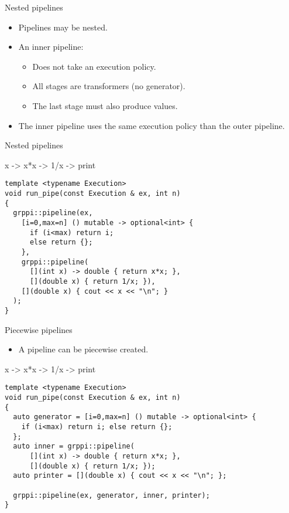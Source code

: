 \begin{frame}[t,fragile]{Nested pipelines}
\begin{itemize}
  \item Pipelines may be nested.
  \vfill
  \item An inner pipeline:
    \begin{itemize}
      \item Does not take an execution policy.
      \item All stages are transformers (no generator).
      \item The last stage must also produce values.
    \end{itemize}
  \vfill
  \item The inner pipeline uses the same execution policy than the outer
        pipeline.
\end{itemize}
\end{frame}

\begin{frame}[t,fragile]{Nested pipelines}
\begin{block}{x -> x*x -> 1/x -> print}
\begin{lstlisting}
template <typename Execution>
void run_pipe(const Execution & ex, int n)
{
  grppi::pipeline(ex,
    [i=0,max=n] () mutable -> optional<int> {
      if (i<max) return i;
      else return {};
    },
    grppi::pipeline(
      [](int x) -> double { return x*x; },
      [](double x) { return 1/x; }),
    [](double x) { cout << x << "\n"; }
  );
}
\end{lstlisting}
\end{block}
\end{frame}

\begin{frame}[t,fragile]{Piecewise pipelines}
\begin{itemize}
  \item A pipeline can be piecewise created.
\end{itemize}
\begin{block}{x -> x*x -> 1/x -> print}
\begin{lstlisting}
template <typename Execution>
void run_pipe(const Execution & ex, int n)
{
  auto generator = [i=0,max=n] () mutable -> optional<int> {
    if (i<max) return i; else return {};
  };
  auto inner = grppi::pipeline(
      [](int x) -> double { return x*x; },
      [](double x) { return 1/x; });
  auto printer = [](double x) { cout << x << "\n"; };

  grppi::pipeline(ex, generator, inner, printer);
}
\end{lstlisting}
\end{block}
\end{frame}

